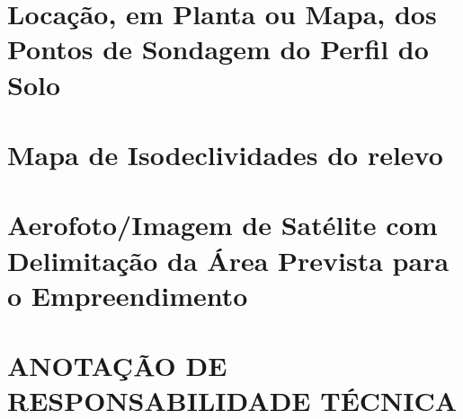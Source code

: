 \chapter{Locação, em Planta ou Mapa, dos Pontos de Sondagem do Perfil do Solo}
\label{chap:sondspec}
\clearpage



\chapter{Mapa de Isodeclividades do relevo}
\label{chap:declividade}
\clearpage


\chapter{Aerofoto/Imagem de Satélite com Delimitação da Área Prevista para o Empreendimento}
\label{chap:delimitacao}
\clearpage

\chapter{ANOTAÇÃO DE RESPONSABILIDADE TÉCNICA}

